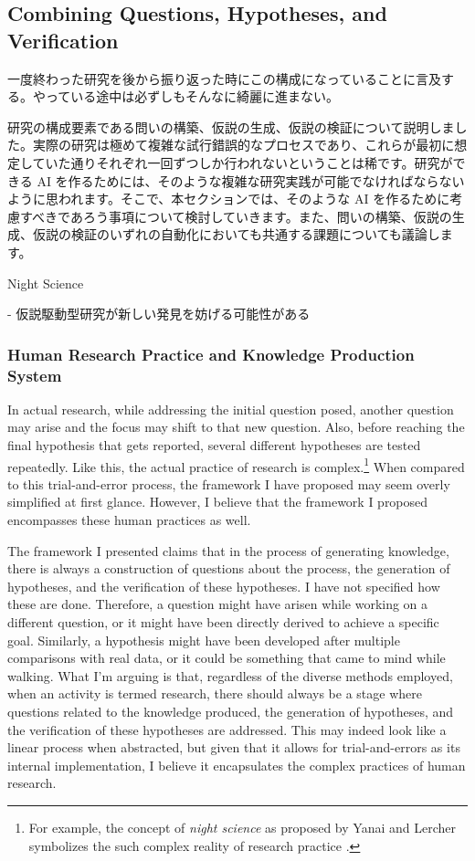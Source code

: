 \subsection{Combining Questions, Hypotheses, and Verification}

一度終わった研究を後から振り返った時にこの構成になっていることに言及する。やっている途中は必ずしもそんなに綺麗に進まない。

研究の構成要素である問いの構築、仮説の生成、仮説の検証について説明しました。実際の研究は極めて複雑な試行錯誤的なプロセスであり、これらが最初に想定していた通りそれぞれ一回ずつしか行われないということは稀です。研究ができる AI を作るためには、そのような複雑な研究実践が可能でなければならないように思われます。そこで、本セクションでは、そのような AI を作るために考慮すべきであろう事項について検討していきます。また、問いの構築、仮説の生成、仮説の検証のいずれの自動化においても共通する課題についても議論します。

Night Science

- 仮説駆動型研究が新しい発見を妨げる可能性がある 
\cite{yanai2020hypothesis}

\subsubsection{Human Research Practice and Knowledge Production System}
In actual research, while addressing the initial question posed, another question may arise and the focus may shift to that new question. Also, before reaching the final hypothesis that gets reported, several different hypotheses are tested repeatedly. Like this, the actual practice of research is complex.\footnote{
For example, the concept of \textit{night science} as proposed by Yanai and Lercher symbolizes the such complex reality of research practice \cite{yanai2019night}.
} When compared to this trial-and-error process, the framework I have proposed may seem overly simplified at first glance. However, I believe that the framework I proposed encompasses these human practices as well.

The framework I presented claims that in the process of generating knowledge, there is always a construction of questions about the process, the generation of hypotheses, and the verification of these hypotheses. I have not specified how these are done. Therefore, a question might have arisen while working on a different question, or it might have been directly derived to achieve a specific goal. Similarly, a hypothesis might have been developed after multiple comparisons with real data, or it could be something that came to mind while walking. What I'm arguing is that, regardless of the diverse methods employed, when an activity is termed research, there should always be a stage where questions related to the knowledge produced, the generation of hypotheses, and the verification of these hypotheses are addressed. This may indeed look like a linear process when abstracted, but given that it allows for trial-and-errors as its internal implementation, I believe it encapsulates the complex practices of human research.

